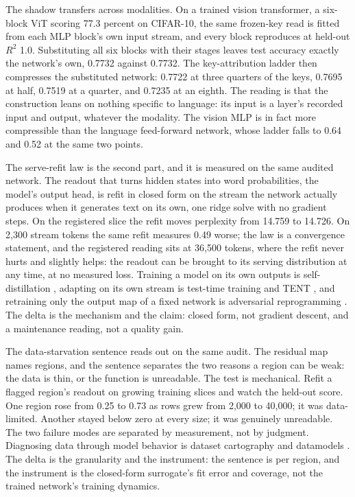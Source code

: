 \documentclass[11pt]{article}
\begin{document}
The shadow transfers across modalities. On a trained vision
transformer, a six-block ViT scoring 77.3 percent on CIFAR-10,
the same frozen-key read is fitted from each MLP block's own
input stream, and every block reproduces at held-out $R^2$ 1.0.
Substituting all six blocks with their stages leaves test
accuracy exactly the network's own, 0.7732 against 0.7732. The
key-attribution ladder then compresses the substituted network:
0.7722 at three quarters of the keys, 0.7695 at half, 0.7519 at
a quarter, and 0.7235 at an eighth. The reading is that the
construction leans on nothing specific to language: its input is
a layer's recorded input and output, whatever the modality. The
vision MLP is in fact more compressible than the language
feed-forward network, whose ladder falls to 0.64 and 0.52 at
the same two points.

The serve-refit law is the second part, and it is measured on
the same audited network. The readout that turns hidden states
into word probabilities, the model's output head, is refit in
closed form on the stream the network actually produces when it
generates text on its own, one ridge solve with no gradient
steps. On the registered slice the refit moves perplexity from
14.759 to 14.726. On 2,300 stream tokens the same refit
measures 0.49 worse; the law is a convergence statement, and
the registered reading sits at 36,500 tokens, where the refit
never hurts and slightly helps: the readout can be brought to
its serving distribution at any time, at no measured loss.
Training a model
on its own outputs is self-distillation \cite{furlanello2018,
zhang2019byot}, adapting on its own stream is test-time
training \cite{sun2020ttt} and TENT \cite{wang2021tent}, and
retraining only the output map of a fixed network is adversarial
reprogramming \cite{elsayed2019}. The delta is the mechanism
and the claim: closed form, not gradient descent, and a
maintenance reading, not a quality gain.

The data-starvation sentence reads out on the same audit. The
residual map names regions, and the sentence separates the two
reasons a region can be weak: the data is thin, or the function
is unreadable. The test is mechanical. Refit a flagged region's
readout on growing training slices and watch the held-out score.
One region rose from 0.25 to 0.73 as rows grew from 2,000 to
40,000; it was data-limited. Another stayed below zero at every
size; it was genuinely unreadable. The two failure modes are
separated by measurement, not by judgment. Diagnosing data
through model behavior is dataset cartography
\cite{swayamdipta2020} and datamodels \cite{ilyas2022}. The
delta is the granularity and the instrument: the sentence is per
region, and the instrument is the closed-form surrogate's fit
error and coverage, not the trained network's training dynamics.
\end{document}

